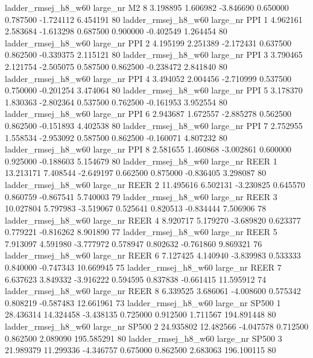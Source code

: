 ladder_rmsej_h8_w60   large_nr       M2                 8  3.198895  1.606982  -3.846690 0.650000 0.787500 -1.724112    6.454191 80
ladder_rmsej_h8_w60   large_nr      PPI                 1  4.962161  2.583684  -1.613298 0.687500 0.900000 -0.402549    1.264454 80
ladder_rmsej_h8_w60   large_nr      PPI                 2  4.195199  2.251389  -2.172431 0.637500 0.862500 -0.339375    2.115121 80
ladder_rmsej_h8_w60   large_nr      PPI                 3  3.790465  2.121754  -2.505075 0.587500 0.862500 -0.238472    2.841840 80
ladder_rmsej_h8_w60   large_nr      PPI                 4  3.494052  2.004456  -2.710999 0.537500 0.750000 -0.201254    3.474064 80
ladder_rmsej_h8_w60   large_nr      PPI                 5  3.178370  1.830363  -2.802364 0.537500 0.762500 -0.161953    3.952554 80
ladder_rmsej_h8_w60   large_nr      PPI                 6  2.943687  1.672557  -2.885278 0.562500 0.862500 -0.151893    4.402538 80
ladder_rmsej_h8_w60   large_nr      PPI                 7  2.752955  1.558534  -2.953092 0.587500 0.862500 -0.160071    4.807232 80
ladder_rmsej_h8_w60   large_nr      PPI                 8  2.581655  1.460868  -3.002861 0.600000 0.925000 -0.188603    5.154679 80
ladder_rmsej_h8_w60   large_nr     REER                 1 13.213171  7.408544  -2.649197 0.662500 0.875000 -0.836405    3.298087 80
ladder_rmsej_h8_w60   large_nr     REER                 2 11.495616  6.502131  -3.230825 0.645570 0.860759 -0.867541    5.740003 79
ladder_rmsej_h8_w60   large_nr     REER                 3 10.027804  5.797983  -3.519067 0.525641 0.820513 -0.834444    7.506906 78
ladder_rmsej_h8_w60   large_nr     REER                 4  8.920717  5.179270  -3.689820 0.623377 0.779221 -0.816262    8.901890 77
ladder_rmsej_h8_w60   large_nr     REER                 5  7.913097  4.591980  -3.777972 0.578947 0.802632 -0.761860    9.869321 76
ladder_rmsej_h8_w60   large_nr     REER                 6  7.127425  4.140940  -3.839983 0.533333 0.840000 -0.747343   10.669945 75
ladder_rmsej_h8_w60   large_nr     REER                 7  6.637623  3.849332  -3.916222 0.594595 0.837838 -0.661415   11.595912 74
ladder_rmsej_h8_w60   large_nr     REER                 8  6.339525  3.686061  -4.008600 0.575342 0.808219 -0.587483   12.661961 73
ladder_rmsej_h8_w60   large_nr    SP500                 1 28.436314 14.324458  -3.438135 0.725000 0.912500  1.711567  194.891448 80
ladder_rmsej_h8_w60   large_nr    SP500                 2 24.935802 12.482566  -4.047578 0.712500 0.862500  2.089090  195.585291 80
ladder_rmsej_h8_w60   large_nr    SP500                 3 21.989379 11.299336  -4.346757 0.675000 0.862500  2.683063  196.100115 80
